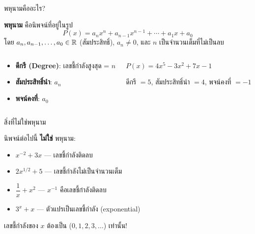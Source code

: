 \documentclass[11pt, aspectratio=169]{beamer}
\begin{document}
\begin{frame}{พหุนามคืออะไร?}
  \begin{explanation}
    \textbf{พหุนาม} คือนิพจน์ที่อยู่ในรูป
    \[
      P(x) = a_n x^n + a_{n-1} x^{n-1} + \cdots + a_1 x + a_0
    \]
    โดย $a_n, a_{n-1}, \ldots, a_0 \in \mathbb{R}$ (สัมประสิทธิ์), $a_n \neq 0$, และ $n$ เป็นจำนวนเต็มที่ไม่เป็นลบ
  \end{explanation}

  \begin{columns}[T]
      \begin{explanation}
        \begin{itemize}
          \item \textbf{ดีกรี (Degree)}: เลขชี้กำลังสูงสุด = $n$
          \item \textbf{สัมประสิทธิ์นำ}: $a_n$
          \item \textbf{พจน์คงที่}: $a_0$
        \end{itemize}
      \end{explanation}
      \begin{exambox}[ตัวอย่าง]
        $P(x) = 4x^5 - 3x^2 + 7x - 1$

        ดีกรี $= 5$, สัมประสิทธิ์นำ $= 4$, พจน์คงที่ $= -1$
      \end{exambox}
  \end{columns}
\end{frame}

\begin{frame}{สิ่งที่ไม่ใช่พหุนาม}
  \begin{explanation}[ข้อควรระวัง]
    นิพจน์ต่อไปนี้ \textbf{ไม่ใช่} พหุนาม:
    \begin{itemize}
      \item $x^{-2} + 3x$ \quad — เลขชี้กำลังติดลบ
      \item $2x^{1/2} + 5$ \quad — เลขชี้กำลังไม่เป็นจำนวนเต็ม
      \item $\dfrac{1}{x} + x^2$ \quad — $x^{-1}$ คือเลขชี้กำลังติดลบ
      \item $3^x + x$ \quad — ตัวแปรเป็นเลขชี้กำลัง (exponential)
    \end{itemize}
  \end{explanation}

  \begin{intuition}[จำง่าย ๆ]
    เลขชี้กำลังของ $x$ ต้องเป็น  ($0, 1, 2, 3, \ldots$) เท่านั้น!
  \end{intuition}
\end{frame}
\end{document}
